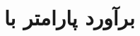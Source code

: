 \documentclass[11pt,a4paper,openany]{book}
\begin{document}
\frontmatter\tableofcontents
\mainmatter
\chapter{برآورد پارامتر با }
\end{document}
